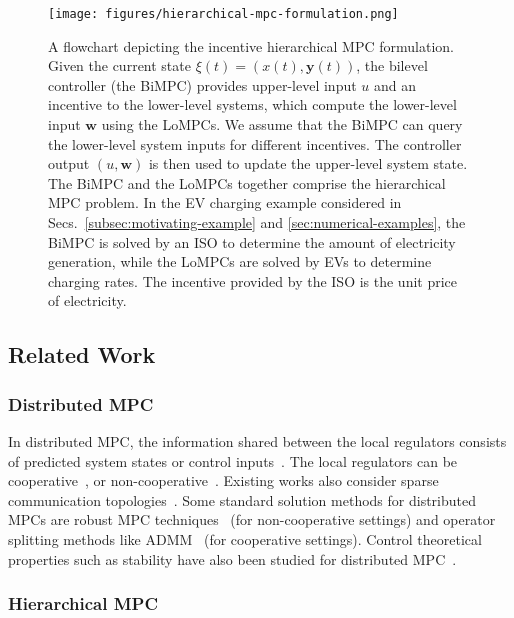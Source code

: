 \begin{figure}%
    \centering
    \texttt{[image: figures/hierarchical-mpc-formulation.png]}
    \caption{A flowchart depicting the incentive hierarchical MPC formulation.
    Given the current state $\xi(t) = (x(t), \bm{y}(t))$, the bilevel controller (the BiMPC) provides upper-level input $u$ and an incentive to the lower-level systems, which compute the lower-level input $\bm{w}$ using the LoMPCs.
    We assume that the BiMPC can query the lower-level system inputs for different incentives. %
    The controller output $(u, \bm{w})$ is then used to update the upper-level system state.
    The BiMPC and the LoMPCs together comprise the hierarchical MPC problem.
    In the EV charging example considered in Secs.~\ref{subsec:motivating-example} and \ref{sec:numerical-examples}, the BiMPC is solved by an ISO to determine the amount of electricity generation, while the LoMPCs are solved by EVs to determine charging rates.
    The incentive provided by the ISO is the unit price of electricity.
    }
    \label{fig:hierarchical-mpc-formulation}
\end{figure}


\subsection{Related Work}
\label{subsec:related-work}

\subsubsection{Distributed MPC}
\label{subsubsec:distributed-mpc}

In distributed MPC, the information shared between the local regulators consists of predicted system states or control inputs~\cite{scattolini2009architectures,negenborn2014distributed}.
The local regulators can be cooperative~\cite{amigoni2007formal,venkat2008distributed}, or non-cooperative~\cite{betti2013distributed}.
Existing works also consider sparse communication topologies~\cite{negenborn2007efficient}.
Some standard solution methods for distributed MPCs are robust MPC techniques~\cite{mayne2005robust} (for non-cooperative settings) and operator splitting methods like ADMM~\cite{boyd2011distributed} (for cooperative settings).
Control theoretical properties such as stability have also been studied for distributed MPC~\cite{venkat2005stability}.


\subsubsection{Hierarchical MPC}
\label{subsubsec:hierarchical-mpc}

